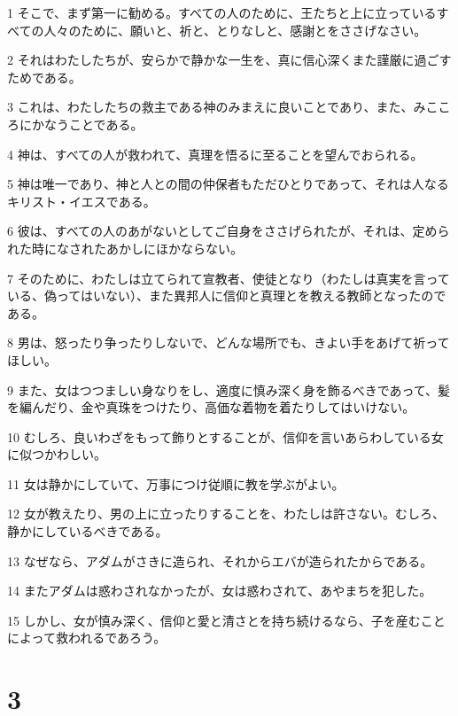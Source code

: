 \par 1 そこで、まず第一に勧める。すべての人のために、王たちと上に立っているすべての人々のために、願いと、祈と、とりなしと、感謝とをささげなさい。
\par 2 それはわたしたちが、安らかで静かな一生を、真に信心深くまた謹厳に過ごすためである。
\par 3 これは、わたしたちの救主である神のみまえに良いことであり、また、みこころにかなうことである。
\par 4 神は、すべての人が救われて、真理を悟るに至ることを望んでおられる。
\par 5 神は唯一であり、神と人との間の仲保者もただひとりであって、それは人なるキリスト・イエスである。
\par 6 彼は、すべての人のあがないとしてご自身をささげられたが、それは、定められた時になされたあかしにほかならない。
\par 7 そのために、わたしは立てられて宣教者、使徒となり（わたしは真実を言っている、偽ってはいない）、また異邦人に信仰と真理とを教える教師となったのである。
\par 8 男は、怒ったり争ったりしないで、どんな場所でも、きよい手をあげて祈ってほしい。
\par 9 また、女はつつましい身なりをし、適度に慎み深く身を飾るべきであって、髪を編んだり、金や真珠をつけたり、高価な着物を着たりしてはいけない。
\par 10 むしろ、良いわざをもって飾りとすることが、信仰を言いあらわしている女に似つかわしい。
\par 11 女は静かにしていて、万事につけ従順に教を学ぶがよい。
\par 12 女が教えたり、男の上に立ったりすることを、わたしは許さない。むしろ、静かにしているべきである。
\par 13 なぜなら、アダムがさきに造られ、それからエバが造られたからである。
\par 14 またアダムは惑わされなかったが、女は惑わされて、あやまちを犯した。
\par 15 しかし、女が慎み深く、信仰と愛と清さとを持ち続けるなら、子を産むことによって救われるであろう。

\chapter{3}

